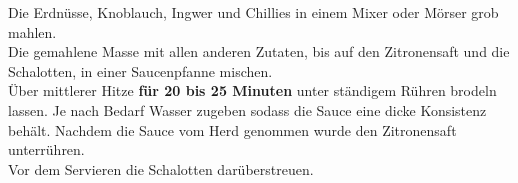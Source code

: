 \vspace*{\fill}
\begin{multicols}{2}


Die Erdnüsse, Knoblauch, Ingwer und Chillies in einem Mixer oder Mörser grob mahlen.\\
Die gemahlene Masse mit allen anderen Zutaten, bis auf den Zitronensaft und die Schalotten, in einer Saucenpfanne
mischen.\\
Über mittlerer Hitze \textbf{für 20 bis 25 Minuten} unter ständigem Rühren brodeln lassen. 
Je nach Bedarf Wasser zugeben sodass die Sauce eine dicke Konsistenz behält.
Nachdem die Sauce vom Herd genommen wurde den Zitronensaft unterrühren.\\
\newline Vor dem Servieren die Schalotten darüberstreuen.



\end{multicols}
\vfill

